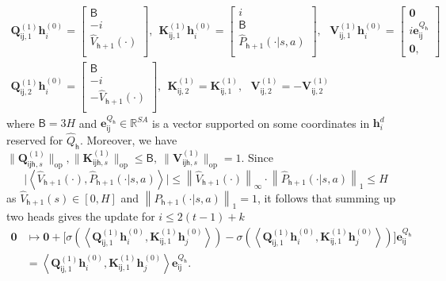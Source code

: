 \documentclass[10pt]{article}
\newcommand{\norm}[1]{\left\|{#1}\right\|}
\newcommand{\lone}[1]{\norm{#1}_1}
\newcommand{\lops}[1]{\|{#1}\|_{\mathrm{op}}}
\newcommand{\linf}[1]{\norm{#1}_\infty}
\newcommand{\<}{\left\langle}
\renewcommand{\>}{\right\rangle}
\renewcommand{\bQ}{\mathbf{Q}}
\newcommand{\bzero}{{\mathbf 0}}
\newcommand{\R}{\mathbb{R}}
\newcommand{\partd}{{d}}
\newcommand{\state}{{s}}
\newcommand{\action}{{a}}
\newcommand{\horizon}{{H}}
\renewcommand{\horizon}{{H}}
\newcommand{\esttransit}{\widehat{P}}
\newcommand{\valuefun}{{V}}
\newcommand{\tfthres}{{\mathsf{B}}}
\newcommand{\Numst}{{S}}
\newcommand{\Numact}{{A}}
\newcommand{\Qfun}{{Q}}
\newcommand{\estQfun}{{\widehat{\Qfun}}}
\newcommand{\Vfun}{{\valuefun}}
\newcommand{\estVfun}{{\widehat{\Vfun}}}
\def\bK{{\mathbf K}}
\def\bQ{{\mathbf Q}}
\def\bV{{\mathbf V}}
\def\be{{\mathbf e}}
\def\bh{{\mathbf h}}
\def\si{{\mathsf{i}}}
\def\sj{{\mathsf{j}}}
\def\sh{{\mathsf{h}}}
\begin{document}
\begin{align*}
   \bQ_{\si\sj,1}^{(1)}\bh_i^{(0)} =\begin{bmatrix}
       \tfthres\\-i\\
       \estVfun_{\sh+1}(\cdot)\\
   \end{bmatrix},~~ \bK_{\si\sj,1}^{(1)}\bh_i^{(0)} =\begin{bmatrix}
       i\\ \tfthres\\
       \esttransit_{\sh+1}(\cdot|\state,\action)\\
   \end{bmatrix},~~~
   \bV_{\si\sj,1}^{(1)}\bh_i^{(0)} =\begin{bmatrix}
       \bzero \\ i\be^{\Qfun_\sh}_{\si\sj}\\
       \bzero,
   \end{bmatrix}
   \\
    \bQ_{\si\sj,2}^{(1)}\bh_i^{(0)} =\begin{bmatrix}
       \tfthres\\-i\\
       -\estVfun_{\sh+1}(\cdot)\\
   \end{bmatrix},~~ \bK_{\si\sj,2}^{(1)}=\bK_{\si\sj,1}^{(1)},~~~
\bV_{\si\sj,2}^{(1)}=-\bV_{\si\sj,2}^{(1)}
\end{align*}
where $\tfthres=3\horizon$ and $\be^{\Qfun_\sh}_{\si\sj}\in\R^{\Numst\Numact}$ is a vector supported on some coordinates in $\bh^\partd_i$ reserved for $\estQfun_\sh$. Moreover, we have $\lops{\bQ^{(1)}_{\si\sj\sh,s}},\lops{\bK^{(1)}_{\si\sj\sh,s}}\leq \tfthres,~\lops{\bV^{(1)}_{\si\sj\sh,s}}=1$.
Since $$\Big|\<\estVfun_{\sh+1}(\cdot),\esttransit_{\sh+1}(\cdot|\state,\action)\>\Big|\leq \linf{\estVfun_{\sh+1}(\cdot)}\cdot\lone{\esttransit_{\sh+1}(\cdot|\state,\action)}\leq\horizon$$ as $\estVfun_{\sh+1}(\state)\in[0,\horizon]$ and $\lone{\esttransit_{\sh+1}(\cdot|\state,\action)}=1$, it follows that summing up two heads gives the update for $i\leq 2(t-1)+k$
\begin{align*}
\bzero
&\mapsto\bzero+\Big[\sigma(\< \bQ_{\si\sj,1}^{(1)}\bh_i^{(0)} , \bK_{\si\sj,1}^{(1)}\bh_j^{(0)} \>)-\sigma(\< \bQ_{\si\sj,1}^{(1)}\bh_i^{(0)} , \bK_{\si\sj,1}^{(1)}\bh_j^{(0)} \>)\Big]\be_{\si\sj}^{\Qfun_\sh}\\
&=\< \bQ_{\si\sj,1}^{(1)}\bh_i^{(0)} , \bK_{\si\sj,1}^{(1)}\bh_j^{(0)} \>\be_{\si\sj}^{\Qfun_\sh}.
\end{align*}
\end{document}
